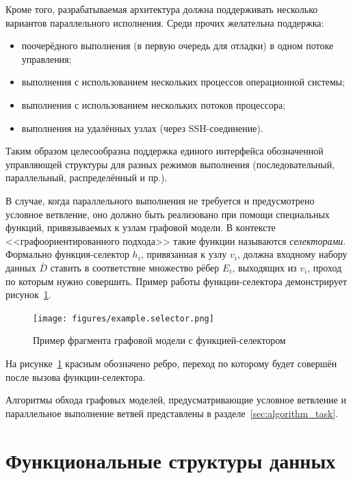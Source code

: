 Кроме того, разрабатываемая архитектура должна поддерживать несколько вариантов параллельного исполнения. Среди прочих желательна поддержка:
\begin{itemize}
    \item поочерёдного выполнения (в первую очередь для отладки) в одном потоке управления;
    \item выполнения с использованием нескольких процессов операционной системы;
    \item выполнения с использованием нескольких потоков процессора;
    \item выполнения на удалённых узлах (через SSH-соединение).
\end{itemize}

Таким образом целесообразна поддержка единого интерфейса обозначенной управляющей структуры для разных режимов выполнения (последовательный, параллельный, распределённый и пр.).

В случае, когда параллельного выполнения не требуется и предусмотрено условное ветвление, оно должно быть реализовано при помощи специальных функций, привязываемых к узлам графовой модели. В контексте <<графоориентированного подхода>> такие функции называются \emph{селекторами}. Формально функция-селектор $h_i$, привязанная к узлу $v_i$, должна входному набору данных $\bar{D}$ ставить в соответствие множество рёбер $E_i$, выходящих из $v_i$, проход по которым нужно совершить. Пример работы функции-селектора демонстрирует рисунок~\ref{fig:graphSelector}.

\begin{figure}[H]
    \centering
    \texttt{[image: figures/example.selector.png]}
    \caption{Пример фрагмента графовой модели с функцией-селектором}
    \label{fig:graphSelector}
\end{figure}

На рисунке~\ref{fig:graphSelector} красным обозначено ребро, переход по которому будет совершён после вызова функции-селектора.

Алгоритмы обхода графовых моделей, предусматривающие условное ветвление и параллельное выполнение ветвей представлены в разделе~\ref{sec:algorithm_task}.
\section{Функциональные структуры данных}\label{sec:functional_classes}
